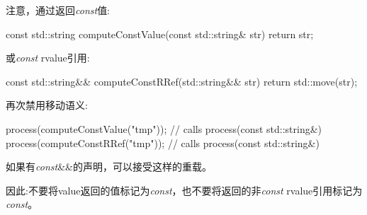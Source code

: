 注意，通过返回\textit{const}值:

\begin{cppcode}
const std::string computeConstValue(const std::string& str) {
	return str;
}
\end{cppcode}

或\textit{const} rvalue引用:

\begin{cppcode}
const std::string&& computeConstRRef(std::string&& str) {
	return std::move(str);
}
\end{cppcode}

再次禁用移动语义:

\begin{cppcode}
process(computeConstValue("tmp")); // calls process(const std::string&)
process(computeConstRRef("tmp")); // calls process(const std::string&)
\end{cppcode}

如果有\textit{const}\&\&的声明，可以接受这样的重载。

因此:不要将value返回的值标记为\textit{const}，也不要将返回的非\textit{const} rvalue引用标记为\textit{const}。


